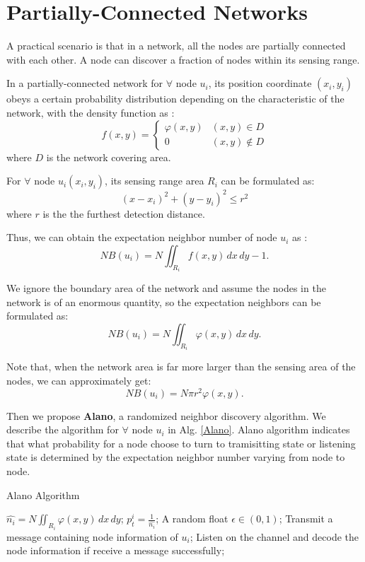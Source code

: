 \section{Partially-Connected Networks}
\label{PCN}



A practical scenario is that in a network,
all the nodes are partially connected with each other.
A node can discover a fraction of nodes within its sensing 
range.

In a partially-connected network for $\forall$ node $u_i$, 
its position coordinate $(x_i,y_i)$
obeys a certain probability distribution depending on the 
characteristic of the network, with the density function as :
$$f(x,y)=
\begin{cases}
\varphi(x,y)& (x,y)\in D\\
0& (x,y)\notin D
\end{cases}$$
where $D$ is the network covering area.

For $\forall$ node $u_i (x_i,y_i)$, its sensing range area $R_i$ can be formulated as:
$$
(x-x_i)^2+(y-y_i)^2 \leq r^2
$$
where $r$ is the the furthest detection distance.

Thus, we can obtain the expectation neighbor number of node $u_i$ as :
$$
NB(u_i) = N\iint_{R_i} f(x,y)\,dx\,dy - 1.
$$

We ignore the boundary area of the network and assume the
nodes in the network is of an enormous quantity, so the 
expectation neighbors can be formulated as:
$$
NB(u_i) = N\iint_{R_i} \varphi(x,y)\,dx\,dy.
$$

Note that, when the network area is far more larger than the
sensing area of the nodes, we can approximately get:
$$
NB(u_i) = N\pi r^2 \varphi(x,y).
$$




Then we propose \textbf{Alano}, a randomized neighbor discovery algorithm. 
We describe the algorithm for $\forall$ node $u_i$ in Alg. \ref{Alano}.
Alano algorithm indicates that what probability for a node choose to turn to  
tramisitting state or listening state is determined
by the expectation neighbor number varying from node to node.


\begin{algorithm}
\caption{Alano Algorithm}
\label{Alano}
\begin{algorithmic}[1]
\STATE $\hat{n_i} = N\iint_{R_i} \varphi(x,y)\,dx\,dy$;
\STATE $p_t^i = \frac{1}{\hat{n_i}}$;
	\STATE A random float $\epsilon \in (0,1)$;
    		\STATE Transmit a message containing node information of $u_i$;
	\ELSE
    		\STATE Listen on the channel and decode the node information if receive a message successfully;
	\ENDIF
\ENDWHILE
\end{algorithmic}
\end{algorithm}

